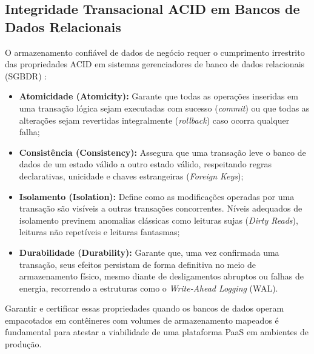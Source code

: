 \subsection{Integridade Transacional ACID em Bancos de Dados Relacionais}
\label{sec:propriedades-acid}

O armazenamento confiável de dados de negócio requer o cumprimento irrestrito das propriedades ACID em sistemas gerenciadores de banco de dados relacionais (SGBDR) \cite{stonebraker1986,silberschatz2018}:
\begin{itemize}
    \item \textbf{Atomicidade (Atomicity):} Garante que todas as operações inseridas em uma transação lógica sejam executadas com sucesso (\textit{commit}) ou que todas as alterações sejam revertidas integralmente (\textit{rollback}) caso ocorra qualquer falha;
    \item \textbf{Consistência (Consistency):} Assegura que uma transação leve o banco de dados de um estado válido a outro estado válido, respeitando regras declarativas, unicidade e chaves estrangeiras (\textit{Foreign Keys});
    \item \textbf{Isolamento (Isolation):} Define como as modificações operadas por uma transação são visíveis a outras transações concorrentes. Níveis adequados de isolamento previnem anomalias clássicas como leituras sujas (\textit{Dirty Reads}), leituras não repetíveis e leituras fantasmas;
    \item \textbf{Durabilidade (Durability):} Garante que, uma vez confirmada uma transação, seus efeitos persistam de forma definitiva no meio de armazenamento físico, mesmo diante de desligamentos abruptos ou falhas de energia, recorrendo a estruturas como o \textit{Write-Ahead Logging} (WAL).
\end{itemize}

Garantir e certificar essas propriedades quando os bancos de dados operam empacotados em contêineres com volumes de armazenamento mapeados é fundamental para atestar a viabilidade de uma plataforma PaaS em ambientes de produção.
